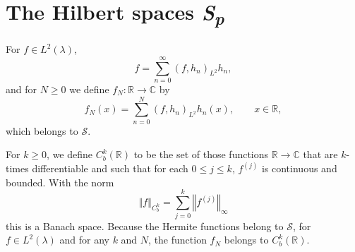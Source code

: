 \documentclass{article}
\newcommand{\norm}[1]{\left\Vert #1 \right\Vert}
\theoremstyle{definition}
\theoremstyle{definition}
\begin{document}
\section{The Hilbert spaces {\em S\textsubscript{p}}}
For $f \in L^2(\lambda)$,
\[
f = \sum_{n=0}^\infty (f,h_n)_{L^2}h_n,
\]
and for $N \geq 0$  we define $f_N:\mathbb{R} \to \mathbb{C}$ by
\[
f_N(x) = \sum_{n=0}^N (f,h_n)_{L^2}h_n(x),\qquad x \in \mathbb{R},
\]
which belongs to $\mathscr{S}$. 

For $k \geq 0$, we define $C_b^k(\mathbb{R})$ to be the set of those functions
$\mathbb{R} \to \mathbb{C}$ that are $k$-times differentiable and
 such that for each $0 \leq j \leq k$, $f^{(j)}$  is continuous and bounded. With the norm
\[
\norm{f}_{C_b^k} = \sum_{j=0}^k \norm{f^{(j)}}_\infty
\]
this is a Banach space. 
Because the Hermite functions belong to $\mathscr{S}$, for $f \in L^2(\lambda)$ and for any $k$ 
and $N$, the function $f_N$ belongs to $C_b^k(\mathbb{R})$.  
\end{document}
